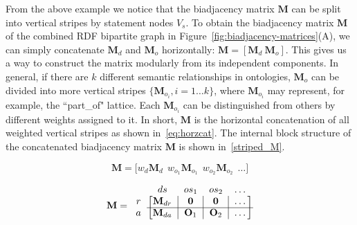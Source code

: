 From the above example we notice that the biadjacency matrix $\mathbf{M}$ can be split into vertical stripes by statement nodes $V_s$. To obtain the biadjacency matrix $\mathbf{M}$ of the combined RDF bipartite graph in Figure~\ref{fig:biadjacency-matrices}(A), we can simply concatenate $\mathbf{M}_d$ and $\mathbf{M}_o$ horizontally: $\mathbf{M}=\left[\mathbf{M}_d~\mathbf{M}_o\right]$. This gives us a way to construct the matrix modularly from its independent components. In general, if there are $k$ different semantic relationships in ontologies, $\mathbf{M}_o$ can be divided into more vertical stripes $\{\mathbf{M}_{o_i}, i=1\dots k\}$, where $\mathbf{M}_{o_i}$ may represent, for example, the ``part\_of" lattice. Each $\mathbf{M}_{o_i}$ can be distinguished from others by different weights assigned to it. In short, $\mathbf{M}$ is the horizontal concatenation of all weighted vertical stripes as shown in~\ref{eq:horzcat}. The internal block structure of the concatenated biadjacency matrix $\mathbf{M}$ is shown in~\ref{striped_M}.

\begin{equation}\label{eq:horzcat}
\mathbf{M} = \bigg[w_d\mathbf{M}_d ~~ w_{o_1}\mathbf{M}_{o_1} ~~ w_{o_2}\mathbf{M}_{o_2} ~~ \dots\bigg]
\end{equation}

\begin{equation}
\label{striped_M}
\mathbf{M}=\begin{blockarray}{ccccc}
                ~ & ds & os_1 & os_2 & \dots \\
            \begin{block}{c[c|c|c|c]}
                r   &   \mathbf{M}_{dr}  &   \mathbf{0}   &   \mathbf{0}   &   \dots \\
                \cline{2-5}
                a   &   \mathbf{M}_{da}  &   \mathbf{O}_1 &   \mathbf{O}_2 &   \dots \\
            \end{block}
        \end{blockarray}
\end{equation}



